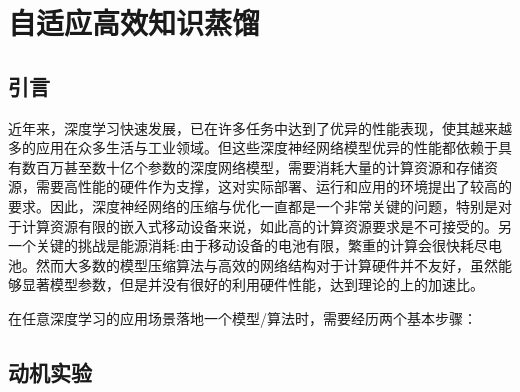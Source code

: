 
\chapter{自适应高效知识蒸馏}

\section{引言}

近年来，深度学习快速发展，已在许多任务中达到了优异的性能表现，使其越来越多的应用在众多生活与工业领域。但这些深度神经网络模型优异的性能都依赖于具有数百万甚至数十亿个参数的深度网络模型，需要消耗大量的计算资源和存储资源，需要高性能的硬件作为支撑，这对实际部署、运行和应用的环境提出了较高的要求。因此，深度神经网络的压缩与优化一直都是一个非常关键的问题，特别是对于计算资源有限的嵌入式移动设备来说，如此高的计算资源要求是不可接受的。另一个关键的挑战是能源消耗:由于移动设备的电池有限，繁重的计算会很快耗尽电池。然而大多数的模型压缩算法与高效的网络结构对于计算硬件并不友好，虽然能够显著模型参数，但是并没有很好的利用硬件性能，达到理论的上的加速比。

在任意深度学习的应用场景落地一个模型/算法时，需要经历两个基本步骤：
\section{动机实验}
